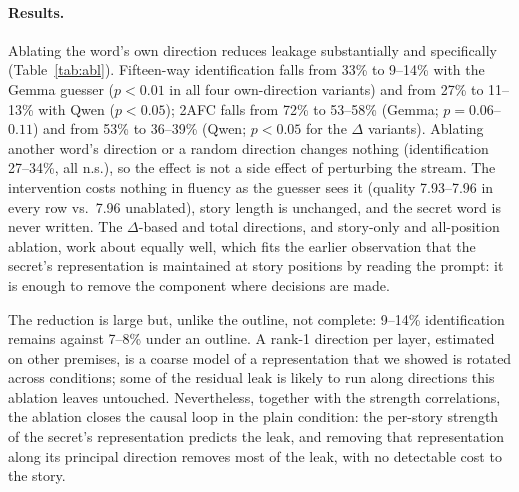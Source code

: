 \documentclass[11pt]{article}
\begin{document}
\paragraph{Results.} Ablating the word's own direction reduces leakage substantially and specifically (Table~\ref{tab:abl}). Fifteen-way identification falls from 33\% to 9--14\% with the Gemma guesser ($p<0.01$ in all four own-direction variants) and from 27\% to 11--13\% with Qwen ($p<0.05$); 2AFC falls from 72\% to 53--58\% (Gemma; $p=0.06$--$0.11$) and from 53\% to 36--39\% (Qwen; $p<0.05$ for the $\Delta$ variants). Ablating another word's direction or a random direction changes nothing (identification 27--34\%, all n.s.), so the effect is not a side effect of perturbing the stream. The intervention costs nothing in fluency as the guesser sees it (quality 7.93--7.96 in every row vs.\ 7.96 unablated), story length is unchanged, and the secret word is never written. The $\Delta$-based and total directions, and story-only and all-position ablation, work about equally well, which fits the earlier observation that the secret's representation is maintained at story positions by reading the prompt: it is enough to remove the component where decisions are made.

The reduction is large but, unlike the outline, not complete: 9--14\% identification remains against 7--8\% under an outline. A rank-1 direction per layer, estimated on other premises, is a coarse model of a representation that we showed is rotated across conditions; some of the residual leak is likely to run along directions this ablation leaves untouched. Nevertheless, together with the strength correlations, the ablation closes the causal loop in the plain condition: the per-story strength of the secret's representation predicts the leak, and removing that representation along its principal direction removes most of the leak, with no detectable cost to the story.
\end{document}
